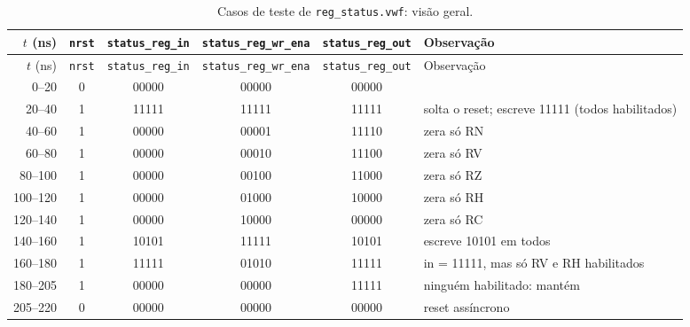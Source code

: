 {\scriptsize\setlength{\tabcolsep}{3pt}
\begin{longtable}{rccccp{4.4cm}}
\caption{Casos de teste de \texttt{reg\_status.vwf}: visão geral.}
\label{tab:caso-reg-status}\\
\hline $t$ (ns) & \texttt{nrst} & \texttt{status\_reg\_in} & \texttt{status\_reg\_wr\_ena} & \texttt{status\_reg\_out} & Observação \\ \hline \endfirsthead
\hline $t$ (ns) & \texttt{nrst} & \texttt{status\_reg\_in} & \texttt{status\_reg\_wr\_ena} & \texttt{status\_reg\_out} & Observação \\ \hline \endhead
0--20 & 0 & 00000 & 00000 & 00000 &  \\
20--40 & 1 & 11111 & 11111 & 11111 & solta o reset; escreve 11111 (todos habilitados) \\
40--60 & 1 & 00000 & 00001 & 11110 & zera só RN \\
60--80 & 1 & 00000 & 00010 & 11100 & zera só RV \\
80--100 & 1 & 00000 & 00100 & 11000 & zera só RZ \\
100--120 & 1 & 00000 & 01000 & 10000 & zera só RH \\
120--140 & 1 & 00000 & 10000 & 00000 & zera só RC \\
140--160 & 1 & 10101 & 11111 & 10101 & escreve 10101 em todos \\
160--180 & 1 & 11111 & 01010 & 11111 & in = 11111, mas só RV e RH habilitados \\
180--205 & 1 & 00000 & 00000 & 11111 & ninguém habilitado: mantém \\
205--220 & 0 & 00000 & 00000 & 00000 & reset assíncrono \\
\hline
\end{longtable}}
\vspace{-0.9cm}
